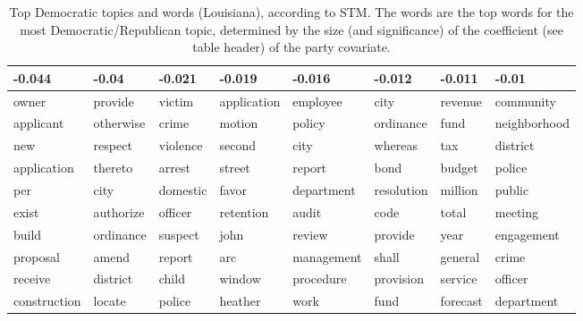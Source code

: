 \begin{table}[ht]
\centering
\begin{tabular}{llllllll}
  \hline
-0.044 & -0.04 & -0.021 & -0.019 & -0.016 & -0.012 & -0.011 & -0.01 \\ 
  \hline
owner & provide & victim & application & employee & city & revenue & community \\ 
  applicant & otherwise & crime & motion & policy & ordinance & fund & neighborhood \\ 
  new & respect & violence & second & city & whereas & tax & district \\ 
  application & thereto & arrest & street & report & bond & budget & police \\ 
  per & city & domestic & favor & department & resolution & million & public \\ 
  exist & authorize & officer & retention & audit & code & total & meeting \\ 
  build & ordinance & suspect & john & review & provide & year & engagement \\ 
  proposal & amend & report & arc & management & shall & general & crime \\ 
  receive & district & child & window & procedure & provision & service & officer \\ 
  construction & locate & police & heather & work & fund & forecast & department \\ 
   \hline
\end{tabular}
\caption{Top Democratic topics and words (Louisiana), according to STM. 
The words are the top words for the most Democratic/Republican topic, determined
by the size (and significance) of the coefficient (see table header) of the party covariate.} 
\label{tabSTMLADem}
\end{table}

